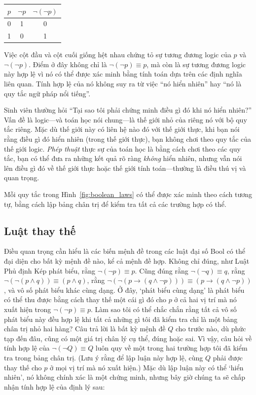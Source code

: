 \begin{center}
\begin{tabular}{c|c|c}
\hline
$p$ & $\lnot p$ & $\lnot(\lnot p)$ \\
\hline
0 & 1 & 0 \\
1 & 0 & 1 \\
\hline
\end{tabular}
\end{center}

Việc cột đầu và cột cuối giống hệt nhau chứng tỏ sự tương đương logic của $p$ và $\lnot(\lnot p)$. Điểm ở đây không chỉ là $\lnot(\lnot p) \equiv p$, mà còn là sự tương đương logic này hợp lệ vì nó có thể được xác minh bằng tính toán dựa trên các định nghĩa liên quan. Tính hợp lệ của nó không suy ra từ việc ``nó hiển nhiên'' hay ``nó là quy tắc ngữ pháp nổi tiếng''.

\begin{infobox}
Sinh viên thường hỏi ``Tại sao tôi phải chứng minh điều gì đó khi nó hiển nhiên?'' Vấn đề là logic---và toán học nói chung---là thế giới nhỏ của riêng nó với bộ quy tắc riêng. Mặc dù thế giới này có liên hệ nào đó với thế giới thực, khi bạn nói rằng điều gì đó hiển nhiên (trong thế giới thực), bạn không chơi theo quy tắc của thế giới logic. \emph{Phép thuật} thực sự của toán học là bằng cách chơi theo các quy tắc, bạn có thể đưa ra những kết quả rõ ràng \emph{không} hiển nhiên, nhưng vẫn nói lên điều gì đó về thế giới thực hoặc thế giới tính toán---thường là điều thú vị và quan trọng.
\end{infobox}

Mỗi quy tắc trong Hình~\ref{fig:boolean_laws} có thể được xác minh theo cách tương tự, bằng cách lập bảng chân trị để kiểm tra tất cả các trường hợp có thể.

\subsection{Luật thay thế}

Điều quan trọng cần hiểu là các biến mệnh đề trong các luật đại số Bool có thể đại diện cho bất kỳ mệnh đề nào, kể cả mệnh đề hợp. Không chỉ đúng, như Luật Phủ định Kép phát biểu, rằng $\lnot(\lnot p) \equiv p$. Cũng đúng rằng $\lnot(\lnot q) \equiv q$, rằng $\lnot(\lnot(p \land q)) \equiv (p \land q)$, rằng $\lnot(\lnot(p \to (q \land \lnot p))) \equiv (p \to (q \land \lnot p))$, và vô số phát biểu khác cùng dạng. Ở đây, `phát biểu cùng dạng' là phát biểu có thể thu được bằng cách thay thế một cái gì đó cho $p$ ở cả hai vị trí mà nó xuất hiện trong $\lnot(\lnot p) \equiv p$. Làm sao tôi có thể chắc chắn rằng tất cả vô số phát biểu này đều hợp lệ khi tất cả những gì tôi đã kiểm tra chỉ là một bảng chân trị nhỏ hai hàng? Câu trả lời là bất kỳ mệnh đề $Q$ cho trước nào, dù phức tạp đến đâu, cũng có một giá trị chân lý cụ thể, đúng hoặc sai. Vì vậy, câu hỏi về tính hợp lệ của $\lnot(\lnot Q) \equiv Q$ luôn quy về một trong hai trường hợp tôi đã kiểm tra trong bảng chân trị. (Lưu ý rằng để lập luận này hợp lệ, cùng $Q$ phải được thay thế cho $p$ ở mọi vị trí mà nó xuất hiện.) Mặc dù lập luận này có thể `hiển nhiên', nó không chính xác là một chứng minh, nhưng bây giờ chúng ta sẽ chấp nhận tính hợp lệ của định lý sau:

